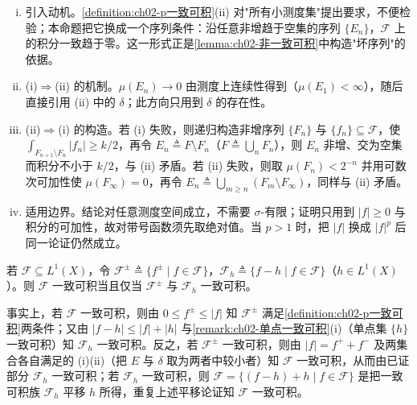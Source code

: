 \documentclass[../../main.tex]{subfiles}%
\begin{document}
\begin{remark}\label{remark:ch02-一致可积刻画}
\begin{enumerate}[(i)]
\item 引入动机。\cref{definition:ch02-p一致可积}(ii) 对"所有小测度集"提出要求，不便检验；本命题把它换成一个序列条件：沿任意非增趋于空集的序列 $\{E_n\}$，$\mathscr F$ 上的积分一致趋于零。这一形式正是\cref{lemma:ch02-非一致可积}中构造"坏序列"的依据。
\item (i)$\Rightarrow$(ii) 的机制。$\mu(E_n)\to0$ 由测度上连续性得到（$\mu(E_1)<\infty$），随后直接引用 (ii) 中的 $\delta$；此方向只用到 $\delta$ 的存在性。
\item (ii)$\Rightarrow$(i) 的构造。若 (i) 失败，则递归构造非增序列 $\{F_n\}$ 与 $\{f_n\}\subseteq\mathscr F$，使 $\int_{F_{n+1}\setminus F_n}|f_n|\geqslant k/2$，再令 $E_n\triangleq F\setminus F_n$（$F\triangleq\bigcup_nF_n$），则 $E_n$ 非增、交为空集而积分不小于 $k/2$，与 (ii) 矛盾。若 (ii) 失败，则取 $\mu(F_n)<2^{-n}$ 并用可数次可加性使 $\mu(F_\infty)=0$，再令 $E_n\triangleq\bigcup_{m\geqslant n}(F_m\setminus F_\infty)$，同样与 (ii) 矛盾。
\item 适用边界。结论对任意测度空间成立，不需要 $\sigma$-有限；证明只用到 $|f|\geqslant0$ 与积分的可加性，故对带号函数须先取绝对值。当 $p>1$ 时，把 $|f|$ 换成 $|f|^p$ 后同一论证仍然成立。
\end{enumerate}
\end{remark}

\begin{remark}\label{remark:ch02-正负一致可积}
若 $\mathscr F\subseteq L^1(X)$，令 $\mathscr F^\pm\triangleq \{f^\pm\mid f\in\mathscr F\}$，$\mathscr F_h\triangleq \{f-h\mid f\in\mathscr F\}$（$h\in L^1(X)$）。则 $\mathscr F$ 一致可积当且仅当 $\mathscr F^\pm$ 与 $\mathscr F_h$ 一致可积。

事实上，若 $\mathscr F$ 一致可积，则由 $0\leqslant f^\pm\leqslant|f|$ 知 $\mathscr F^\pm$ 满足\cref{definition:ch02-p一致可积}两条件；又由 $|f-h|\leqslant|f|+|h|$ 与\cref{remark:ch02-单点一致可积}(i)（单点集 $\{h\}$ 一致可积）知 $\mathscr F_h$ 一致可积。反之，若 $\mathscr F^\pm$ 一致可积，则由 $|f|=f^++f^-$ 及两集合各自满足的 (i)(ii)（把 $E$ 与 $\delta$ 取为两者中较小者）知 $\mathscr F$ 一致可积，从而由已证部分 $\mathscr F_h$ 一致可积；若 $\mathscr F_h$ 一致可积，则 $\mathscr F=\{(f-h)+h\mid f\in\mathscr F\}$ 是把一致可积族 $\mathscr F_h$ 平移 $h$ 所得，重复上述平移论证知 $\mathscr F$ 一致可积。
\end{remark}
\end{document}

